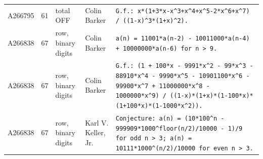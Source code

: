\documentclass[11pt]{article}
\theoremstyle{definition}
\theoremstyle{remark}
\begin{document}
{\begin{longtable}{p{1.3cm}p{0.7cm}p{2.4cm}p{2.3cm}p{7.3cm}}
A266795 & 61 & total OFF & Colin Barker & \texttt{G.f.: \allowbreak{}x*\allowbreak{}(1+\allowbreak{}3*\allowbreak{}x-\allowbreak{}x\^{}3+\allowbreak{}x\^{}4+\allowbreak{}x\^{}5-\allowbreak{}2*\allowbreak{}x\^{}6+\allowbreak{}x\^{}7)\allowbreak{} \allowbreak{}/\allowbreak{} \allowbreak{}((1-\allowbreak{}x)\allowbreak{}\^{}3*\allowbreak{}(1+\allowbreak{}x)\allowbreak{}\^{}2)\allowbreak{}.} \\
A266838 & 67 & row, binary digits & Colin Barker & \texttt{a(n)\allowbreak{} \allowbreak{}=\allowbreak{} \allowbreak{}11001*\allowbreak{}a(n-\allowbreak{}2)\allowbreak{} \allowbreak{}-\allowbreak{} \allowbreak{}10011000*\allowbreak{}a(n-\allowbreak{}4)\allowbreak{} \allowbreak{}+\allowbreak{} \allowbreak{}10000000*\allowbreak{}a(n-\allowbreak{}6)\allowbreak{} \allowbreak{}for \allowbreak{}n \allowbreak{}> \allowbreak{}9.} \\
A266838 & 67 & row, binary digits & Colin Barker & \texttt{G.f.: \allowbreak{}(1 \allowbreak{}+\allowbreak{} \allowbreak{}100*\allowbreak{}x \allowbreak{}-\allowbreak{} \allowbreak{}9991*\allowbreak{}x\^{}2 \allowbreak{}-\allowbreak{} \allowbreak{}99*\allowbreak{}x\^{}3 \allowbreak{}-\allowbreak{} \allowbreak{}88910*\allowbreak{}x\^{}4 \allowbreak{}-\allowbreak{} \allowbreak{}9990*\allowbreak{}x\^{}5 \allowbreak{}-\allowbreak{} \allowbreak{}10901100*\allowbreak{}x\^{}6 \allowbreak{}-\allowbreak{} \allowbreak{}99900*\allowbreak{}x\^{}7 \allowbreak{}+\allowbreak{} \allowbreak{}11000000*\allowbreak{}x\^{}8 \allowbreak{}-\allowbreak{} \allowbreak{}1000000*\allowbreak{}x\^{}9)\allowbreak{} \allowbreak{}/\allowbreak{} \allowbreak{}((1-\allowbreak{}x)\allowbreak{}*\allowbreak{}(1+\allowbreak{}x)\allowbreak{}*\allowbreak{}(1-\allowbreak{}100*\allowbreak{}x)\allowbreak{}*\allowbreak{}(1+\allowbreak{}100*\allowbreak{}x)\allowbreak{}*\allowbreak{}(1-\allowbreak{}1000*\allowbreak{}x\^{}2)\allowbreak{})\allowbreak{}.} \\
A266838 & 67 & row, binary digits & Karl V. Keller, Jr. & \texttt{Conjecture: \allowbreak{}a(n)\allowbreak{} \allowbreak{}=\allowbreak{} \allowbreak{}(10*\allowbreak{}100\^{}n \allowbreak{}-\allowbreak{} \allowbreak{}999909*\allowbreak{}1000\^{}floor(n/\allowbreak{}2)\allowbreak{}/\allowbreak{}10000 \allowbreak{}-\allowbreak{} \allowbreak{}1)\allowbreak{}/\allowbreak{}9 \allowbreak{}for \allowbreak{}odd \allowbreak{}n \allowbreak{}> \allowbreak{}3; \allowbreak{}a(n)\allowbreak{} \allowbreak{}=\allowbreak{} \allowbreak{}10111*\allowbreak{}1000\^{}(n/\allowbreak{}2)\allowbreak{}/\allowbreak{}10000 \allowbreak{}for \allowbreak{}even \allowbreak{}n \allowbreak{}> \allowbreak{}3.} \\

\end{longtable}}
\end{document}
